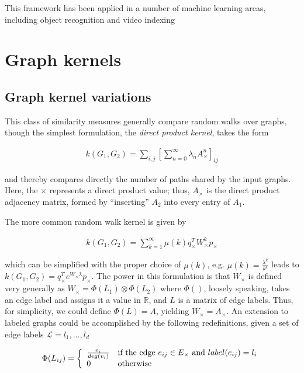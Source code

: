 \documentclass[11pt]{article}
\begin{document}
This framework has been applied in a number of machine learning areas, including object recognition and video indexing \cite{edit distance refs}

\section{Graph kernels}
\subsection{Graph kernel variations}
This class of similarity measures generally compare random walks over graphs, though the simplest formulation, the \textit{direct product kernel}, takes the form

\begin{align}
k(G_1, G_2) = \sum\limits_{i,j}[\sum\limits_{n=0}^{\infty}\lambda_n A_\times^n]_{ij}
\label{eqn:dpk}
\end{align}

and thereby compares directly the number of paths shared by the input graphs. Here, the $\times$ represents a direct product value; thus, $A_\times$ is the direct product adjacency matrix, formed by ``inserting'' $A_2$ into every entry of $A_1$. 

The more common random walk kernel is given by 

\begin{align}
k(G_1, G_2) = \sum\limits_{k=1}^{\infty}\mu(k) q_\times^T W_\times^k p_\times
\label{eqn:gk}
\end{align}


which can be simplified with the proper choice of $\mu(k)$, e.g. $\mu(k) = \frac{\lambda^k}{k!}$ leads to $k(G_1, G_2) = q_\times^T e^{W_\times \lambda} p_\times$. The power in this formulation is that $W_\times$ is defined very generally as $W_\times = \Phi(L_1)\otimes\Phi(L_2)$ where $\Phi()$, loosely speaking, takes an edge label and assigns it a value in $\mathbb{R}$, and $L$ is a matrix of edge labels. Thus, for simplicity, we could define $\Phi(L) = A$, yielding $W_\times = A_\times$. An extension to labeled graphs could be accomplished by the following redefinitions, given a set of edge labels $\mathcal{L} = {l_1,...,l_d}$

\begin{equation}
\Phi(L_{ij}) = \left \{
\begin{array}{l l}
\frac{e_i}{deg(v_i)} & \text{if the edge $e_{ij} \in E_\times$ and $label(e_{ij}) = l_i$} \\
0 & \text{otherwise}
\end{array}
\right.
\label{eqn:lgk} 
\end{equation}
\end{document}
